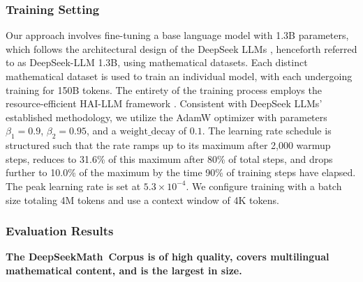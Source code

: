 \begin{itemize}[topsep=0pt]
\subsubsection{Training Setting}
\label{sec:quality-policy}
Our approach involves fine-tuning a base language model with 1.3B parameters, which follows the architectural design of the DeepSeek LLMs \citep{deepseek-llm}, henceforth referred to as DeepSeek-LLM 1.3B, using mathematical datasets. Each distinct mathematical dataset is used to train an individual model, with each undergoing training for 150B tokens. The entirety of the training process employs the resource-efficient HAI-LLM framework \citep{haillm}. Consistent with DeepSeek LLMs’ established methodology, we utilize the AdamW optimizer \citep{adamW} with parameters $\beta_1=0.9$, $\beta_2=0.95$, and a $\mathrm{weight\_decay}$ of $0.1$. The learning rate schedule is structured such that the rate ramps up to its maximum after 2,000 warmup steps, reduces to 31.6\% of this maximum after 80\% of total steps, and drops further to 10.0\% of the maximum by the time 90\% of training steps have elapsed. The peak learning rate is set at $5.3\times10^{-4}$. We configure training with a batch size totaling 4M tokens and use a context window of 4K tokens.

\subsubsection{Evaluation Results}

\textbf{The DeepSeekMath~Corpus is of high quality, covers multilingual mathematical content, and is the largest in size.}


\end{itemize}
